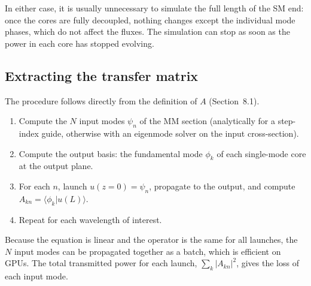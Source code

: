 \documentclass[11pt,a4paper]{article}
\newcommand{\braket}[2]{\langle #1|#2\rangle}
\begin{document}
In either case, it is usually unnecessary to simulate the full length of the SM end: once the cores are fully decoupled, nothing changes except the individual mode phases, which do not affect the fluxes. The simulation can stop as soon as the power in each core has stopped evolving.

\subsection{Extracting the transfer matrix}
The procedure follows directly from the definition of $A$ (Section~8.1).
\begin{enumerate}
\item Compute the $N$ input modes $\psi_n$ of the MM section (analytically for a step-index guide, otherwise with an eigenmode solver on the input cross-section).
\item Compute the output basis: the fundamental mode $\phi_k$ of each single-mode core at the output plane.
\item For each $n$, launch $u(z=0) = \psi_n$, propagate to the output, and compute $A_{kn} = \braket{\phi_k}{u(L)}$.
\item Repeat for each wavelength of interest.
\end{enumerate}
Because the equation is linear and the operator is the same for all launches, the $N$ input modes can be propagated together as a batch, which is efficient on GPUs. The total transmitted power for each launch, $\sum_k |A_{kn}|^2$, gives the loss of each input mode.
\end{document}
